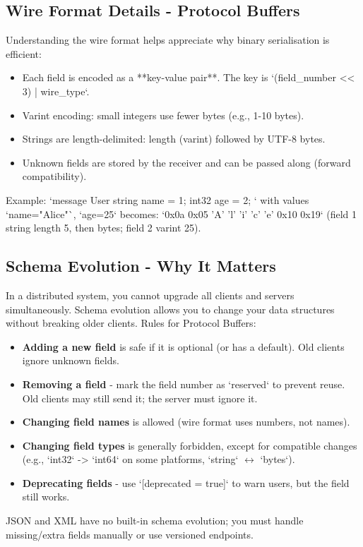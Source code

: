 \documentclass[a4paper]{article}
\begin{document}
\subsection{Wire Format Details - Protocol Buffers}
Understanding the wire format helps appreciate why binary serialisation is efficient:
\begin{itemize}
    \item Each field is encoded as a **key-value pair**. The key is `(field\_number << 3) | wire\_type`.
    \item Varint encoding: small integers use fewer bytes (e.g., 1-10 bytes).
    \item Strings are length-delimited: length (varint) followed by UTF-8 bytes.
    \item Unknown fields are stored by the receiver and can be passed along (forward compatibility).
\end{itemize}
Example: `message User { string name = 1; int32 age = 2; }` with values `name="Alice"`, `age=25` becomes:  
`0x0a 0x05 'A' 'l' 'i' 'c' 'e' 0x10 0x19` (field 1 string length 5, then bytes; field 2 varint 25).

\subsection{Schema Evolution - Why It Matters}
In a distributed system, you cannot upgrade all clients and servers simultaneously. Schema evolution allows you to change your data structures without breaking older clients. Rules for Protocol Buffers:
\begin{itemize}
    \item \textbf{Adding a new field} is safe if it is optional (or has a default). Old clients ignore unknown fields.
    \item \textbf{Removing a field} - mark the field number as `reserved` to prevent reuse. Old clients may still send it; the server must ignore it.
    \item \textbf{Changing field names} is allowed (wire format uses numbers, not names).
    \item \textbf{Changing field types} is generally forbidden, except for compatible changes (e.g., `int32` -> `int64` on some platforms, `string` $\leftrightarrow$ `bytes`).
    \item \textbf{Deprecating fields} - use `[deprecated = true]` to warn users, but the field still works.
\end{itemize}
JSON and XML have no built-in schema evolution; you must handle missing/extra fields manually or use versioned endpoints.
\end{document}
